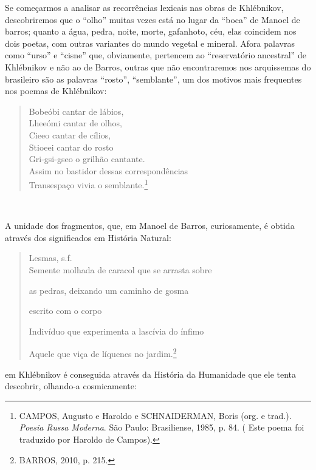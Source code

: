 Se começarmos a analisar as recorrências lexicais nas obras de
Khlébnikov, descobriremos que o ``olho'' muitas vezes está no lugar da
``boca'' de Manoel de barros; quanto a água, pedra, noite, morte,
gafanhoto, céu, elas coincidem nos dois poetas, com outras variantes do
mundo vegetal e mineral. Afora palavras como ``urso'' e ``cisne'' que,
obviamente, pertencem ao ``reservatório ancestral'' de Khlébnikov e não
ao de Barros, outras que não encontraremos nos arquissemas do brasileiro
são as palavras ``rosto'', ``semblante'', um dos motivos mais frequentes
nos poemas de Khlébnikov:

\begin{quote}
Bobeóbi cantar de lábios,\\
Lheeómi cantar de olhos,\\
Cieeo cantar de cílios,\\
Stioeei cantar do rosto\\
Gri-gsi-gseo o grilhão cantante.\\
\hspace*{0.333em}Assim no bastidor dessas correspondências\\
\hspace*{0.333em}Transespaço vivia o semblante.\footnote{CAMPOS, Augusto
  e Haroldo e SCHNAIDERMAN, Boris (org. e trad.). \emph{Poesia Russa
  Moderna}. São Paulo: Brasiliense, 1985, p. 84. ( Este poema foi
  traduzido por Haroldo de Campos).}
\end{quote}

~~~~~~~~~~~~~

A unidade dos fragmentos, que, em Manoel de Barros, curiosamente, é
obtida através dos significados em História Natural:

\begin{quote}
Lesmas, s.f.~\\
Semente molhada de caracol que se arrasta sobre

as pedras, deixando um caminho de gosma

escrito com o corpo

Indivíduo que experimenta a lascívia do ínfimo

Aquele que viça de líquenes no jardim.\footnote{BARROS, 2010, p. 215.}
\end{quote}

em Khlébnikov é conseguida através da História da Humanidade que ele
tenta descobrir, olhando-a cosmicamente:

